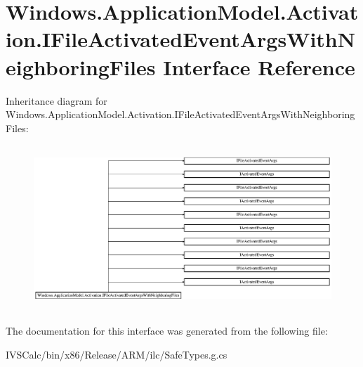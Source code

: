 \hypertarget{interface_windows_1_1_application_model_1_1_activation_1_1_i_file_activated_event_args_with_neighboring_files}{}\section{Windows.\+Application\+Model.\+Activation.\+I\+File\+Activated\+Event\+Args\+With\+Neighboring\+Files Interface Reference}
\label{interface_windows_1_1_application_model_1_1_activation_1_1_i_file_activated_event_args_with_neighboring_files}
Inheritance diagram for Windows.\+Application\+Model.\+Activation.\+I\+File\+Activated\+Event\+Args\+With\+Neighboring\+Files\+:\begin{figure}[H]
\begin{center}
\leavevmode
\includegraphics[height=6.260162cm]{interface_windows_1_1_application_model_1_1_activation_1_1_i_file_activated_event_args_with_neighboring_files}
\end{center}
\end{figure}


The documentation for this interface was generated from the following file\+:\begin{DoxyCompactItemize}
\item 
I\+V\+S\+Calc/bin/x86/\+Release/\+A\+R\+M/ilc/Safe\+Types.\+g.\+cs\end{DoxyCompactItemize}
